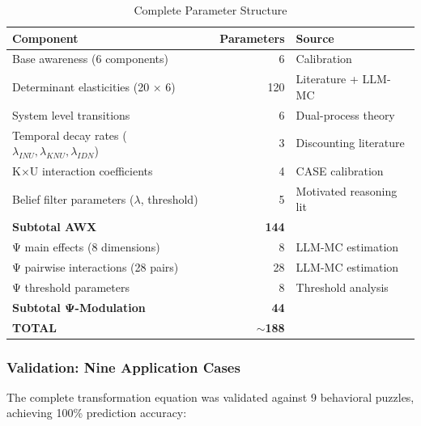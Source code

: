 \begin{table}[htbp]
\centering
\caption{Complete Parameter Structure}
\label{tab:parameter-count-complete}
\begin{tabular}{@{}lrl@{}}
\toprule
\textbf{Component} & \textbf{Parameters} & \textbf{Source} \\
\midrule
Base awareness (6 components) & 6 & Calibration \\
Determinant elasticities (20 × 6) & 120 & Literature + LLM-MC \\
System level transitions & 6 & Dual-process theory \\
Temporal decay rates ($\lambda_{INU}, \lambda_{KNU}, \lambda_{IDN}$) & 3 & Discounting literature \\
K×U interaction coefficients & 4 & CASE calibration \\
Belief filter parameters ($\lambda$, threshold) & 5 & Motivated reasoning lit \\
\midrule
\textbf{Subtotal AWX} & \textbf{144} & \\
\midrule
Ψ main effects (8 dimensions) & 8 & LLM-MC estimation \\
Ψ pairwise interactions (28 pairs) & 28 & LLM-MC estimation \\
Ψ threshold parameters & 8 & Threshold analysis \\
\midrule
\textbf{Subtotal Ψ-Modulation} & \textbf{44} & \\
\midrule
\textbf{TOTAL} & \textbf{$\sim$188} & \\
\bottomrule
\end{tabular}
\end{table}

\subsubsection{Validation: Nine Application Cases}

The complete transformation equation was validated against 9 behavioral 
puzzles, achieving 100\% prediction accuracy:

